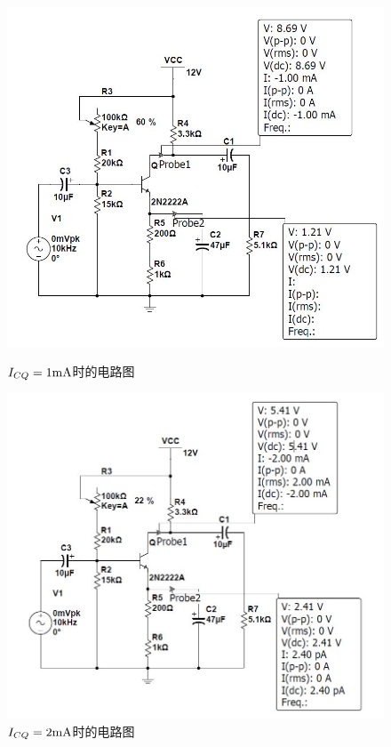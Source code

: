\documentclass[UTF8,a4paper]{paper}
\begin{document}
\begin{figure}
\centering
\includegraphics[width=\textwidth]{1.jpg}
\caption{$I_{CQ}=1\rm{mA}$时的电路图}
\label{1}
\includegraphics[width=\textwidth]{2.jpg}
\caption{$I_{CQ}=2\rm{mA}$时的电路图}
\label{2}
\end{figure}
\end{document}
